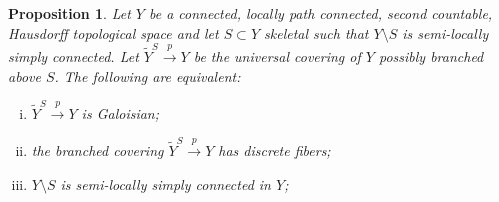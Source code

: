 \documentclass[a4paper,12pt]{article}
\newtheorem{prop}[lem]{Proposition}
\begin{document}
\begin{prop} \label{prop:Galoisian_semilocal}
Let $Y$ be a connected, locally path connected, second countable, Hausdorff topological space and let $S\subset Y$ skeletal such that $Y\setminus S$ is semi-locally simply connected.
Let $\widetilde Y^S\xrightarrow{p} Y$ be the universal covering of $Y$ possibly branched  above $S$. The following are equivalent:
\begin{enumerate}[(i)]
\item $\widetilde Y^S\xrightarrow{p} Y$  is Galoisian;
 \item the branched covering $\widetilde Y^S\xrightarrow{p} Y$ has discrete fibers;
  \item $Y\setminus S$ is semi-locally simply connected in $Y$;
\end{enumerate}
\end{prop}
\end{document}
